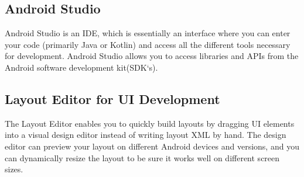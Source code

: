 \documentclass[11pt,a4paper]{report}
\begin{document}
		\subsection*{\Large{Android Studio}}
		
		Android Studio is an IDE, which is essentially an interface where you can enter your code (primarily Java or Kotlin) and access all the different tools necessary for development. Android Studio allows you to access libraries and APIs from the Android software development kit(SDK`s).
		
		\subsection*{\Large{Layout Editor for UI Development}}

		The Layout Editor enables you to quickly build layouts by dragging UI elements into a visual design editor instead of writing layout XML by hand. The design editor can preview your layout on different Android devices and versions, and you can dynamically resize the layout to be sure it works well on different screen sizes.
		
		\vskip 25cm
\end{document}
